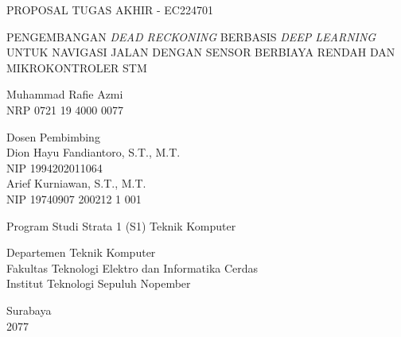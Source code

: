 \begin{large}
  PROPOSAL TUGAS AKHIR - EC224701
\end{large}

\vspace{\fill}

\begin{spacing}{1.5}
  \begin{Large}
    PENGEMBANGAN \emph{DEAD RECKONING} BERBASIS \emph{DEEP LEARNING}  
    UNTUK NAVIGASI JALAN DENGAN SENSOR BERBIAYA RENDAH 
    DAN MIKROKONTROLER STM 
  \end{Large}
\end{spacing}

\vspace{\fill}

\begin{large}
  Muhammad Rafie Azmi \\
  \textmd{NRP 0721 19 4000 0077}
\end{large}

\vspace{\fill}

\begin{large}
  \textmd{Dosen Pembimbing} \\
  Dion Hayu Fandiantoro, S.T., M.T. \\
  \textmd{NIP 1994202011064} \\
  Arief Kurniawan, S.T., M.T. \\
  \textmd{NIP 19740907 200212 1 001}
\end{large}

\vspace{\fill}

Program Studi Strata 1 (S1) Teknik Komputer \\

\mdseries

Departemen Teknik Komputer \\
Fakultas Teknologi Elektro dan Informatika Cerdas \\
Institut Teknologi Sepuluh Nopember

Surabaya \\
2077
